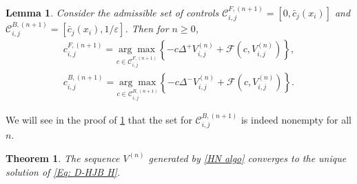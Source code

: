 \documentclass[11pt]{article}
\numberwithin{equation}{section}
\numberwithin{algorithm}{section}
\newtheorem{theorem}{Theorem}[section]
\newtheorem{lemma}[lemma]{Lemma}
\newcommand{\lc}{\left(}
\newcommand{\rc}{\right)}
\newcommand{\eps}{\varepsilon}
\theoremstyle{plain}
\newcommand{\D}{\Delta}
\begin{document}
\begin{lemma}\label{Lemma: c max}
Consider the admissible set of controls 
$\mathcal{C}^{F,(n+1)}_{i,j}=[0,\bar{c}_{j}(x_i)]$ and
 $\mathcal{C}^{B,(n+1)}_{i,j}=\left[\bar{c}_{j}(x_i),1/\eps\right]$.
Then for $n\geq 0$,
$$
\begin{aligned}
c^{F,({n}+1)}_{i,j}=\underset{c\in \mathcal{C}^{F,(n+1)}_{i,j}}{\arg \max}\left\{ -c\D^+{V^{({n})}_{i,j}}+\mathcal{F}\lc c,V^{({n})}_{i,j}\rc\right\},\\
c^{B,({n}+1)}_{i,j}=\underset{c\in \mathcal{C}^{B,(n+1)}_{i,j}}{\arg \max}\left\{ -c\D^-{V^{({n})}_{i,j}}+\mathcal{F}\lc c,V^{({n})}_{i,j}\rc\right\}.
\end{aligned}
$$
\end{lemma}
We will see in the proof of \cref{Thm: Howard-Newton} that the set for $\mathcal{C}^{B,(n+1)}_{i,j}$ is indeed nonempty for all $n$.  
\begin{theorem}\label{Thm: Howard-Newton}
The sequence $V^{(n)}$ generated by \cref{HN algo} converges to the unique solution of \cref{Eq: D-HJB H}. 
\end{theorem}
\end{document}
